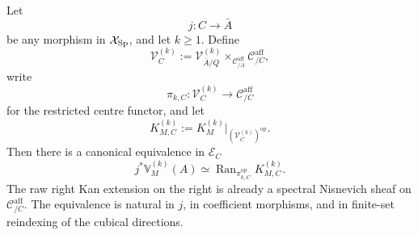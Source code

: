 \begin{lemma}
\label{lem:var-restricted-cubical-right-kan}
Let
\[
    j:C\longrightarrow\bar A
\]
be any morphism in \(\mathcal{X}_{\mathrm{Sp}}\), and let \(k\ge1\). Define
\[
    \mathcal V_C^{(k)}
    :=
    \mathcal V^{(k)}_{\bar A/Q}
    \times_{\mathcal C^{\mathrm{aff}}_{/\bar A}}
    \mathcal C^{\mathrm{aff}}_{/C},
\]
write
\[
    \pi_{k,C}:
    \mathcal V_C^{(k)}
    \longrightarrow
    \mathcal C^{\mathrm{aff}}_{/C}
\]
for the restricted centre functor, and let
\[
    K_{M,C}^{(k)}
    :=
    K_M^{(k)}\big|_{(\mathcal V_C^{(k)})^{\mathrm{op}}}.
\]
Then there is a canonical equivalence in \(\mathcal E_C\)
\[
    \boxed{
    j^*\mathbb V_M^{(k)}(A)
    \simeq
    \operatorname{Ran}_{\pi_{k,C}^{\mathrm{op}}}
    K_{M,C}^{(k)}.
    }
\]
The raw right Kan extension on the right is already a spectral Nisnevich sheaf on
\(\mathcal C^{\mathrm{aff}}_{/C}\).  The equivalence is natural in \(j\), in coefficient morphisms, and in finite-set reindexing of the cubical directions.
\end{lemma}

